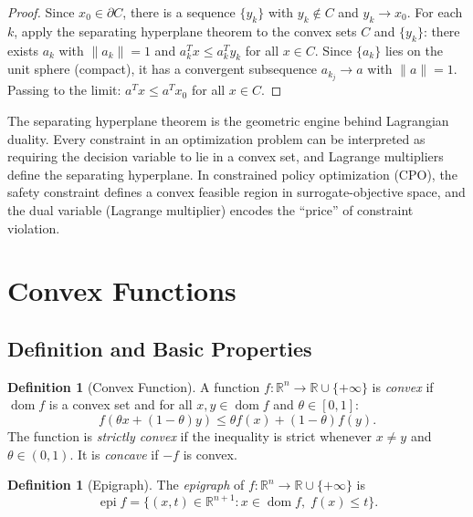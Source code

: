 \documentclass[11pt,a4paper]{article}
\theoremstyle{definition}
\newtheorem{definition}[theorem]{Definition}
\theoremstyle{remark}
\newcommand{\R}{\mathbb{R}}
\DeclareMathOperator{\dom}{dom}
\DeclareMathOperator{\epi}{epi}
\begin{document}
\begin{proof}
Since $x_0 \in \partial C$, there is a sequence $\{y_k\}$ with $y_k \notin C$ and
$y_k \to x_0$. For each $k$, apply the separating hyperplane theorem to the convex sets
$C$ and $\{y_k\}$: there exists $a_k$ with $\|a_k\| = 1$ and $a_k^T x \le a_k^T y_k$
for all $x \in C$. Since $\{a_k\}$ lies on the unit sphere (compact), it has a
convergent subsequence $a_{k_j} \to a$ with $\|a\| = 1$. Passing to the limit:
$a^T x \le a^T x_0$ for all $x \in C$.
\end{proof}

\begin{rlconnection}
The separating hyperplane theorem is the geometric engine behind Lagrangian duality.
Every constraint in an optimization problem can be interpreted as requiring the
decision variable to lie in a convex set, and Lagrange multipliers define the
separating hyperplane. In constrained policy optimization (CPO), the safety constraint
defines a convex feasible region in surrogate-objective space, and the dual variable
(Lagrange multiplier) encodes the ``price'' of constraint violation.
\end{rlconnection}

\section{Convex Functions}

\subsection{Definition and Basic Properties}

\begin{definition}[Convex Function]
\label{def:convex-function}
A function $f : \R^n \to \R \cup \{+\infty\}$ is \emph{convex} if $\dom f$ is a convex
set and for all $x, y \in \dom f$ and $\theta \in [0,1]$:
\[
  f(\theta x + (1-\theta) y) \le \theta f(x) + (1-\theta) f(y).
\]
The function is \emph{strictly convex} if the inequality is strict whenever $x \ne y$
and $\theta \in (0,1)$. It is \emph{concave} if $-f$ is convex.
\end{definition}

\begin{definition}[Epigraph]
\label{def:epigraph}
The \emph{epigraph} of $f : \R^n \to \R \cup \{+\infty\}$ is
\[
  \epi f = \{(x, t) \in \R^{n+1} : x \in \dom f, \; f(x) \le t\}.
\]
\end{definition}
\end{document}
